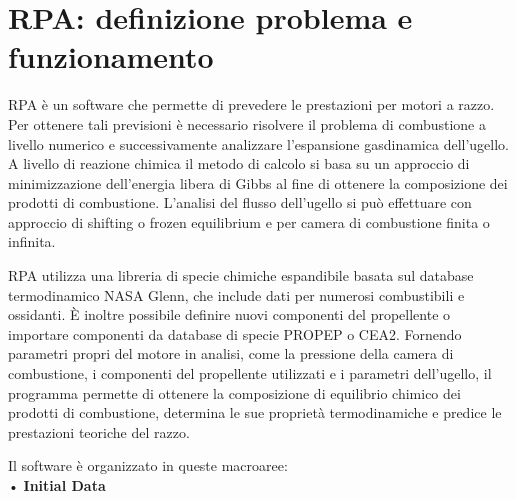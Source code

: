 \section{RPA: definizione problema e funzionamento}
\label{appendix:rpa}

RPA è un software che permette di prevedere le prestazioni per motori a razzo. Per ottenere tali previsioni è necessario risolvere il problema di combustione a livello numerico e successivamente analizzare l'espansione gasdinamica dell'ugello. \\
A livello di reazione chimica il metodo di calcolo si basa su un approccio di minimizzazione dell'energia libera di Gibbs al fine di ottenere la composizione dei prodotti di combustione.  L'analisi del flusso dell'ugello si può effettuare con approccio di shifting o frozen equilibrium e per camera di combustione finita o infinita.

RPA utilizza una libreria di specie chimiche espandibile basata sul database termodinamico NASA Glenn, che include dati per numerosi combustibili e ossidanti. È inoltre possibile definire nuovi componenti del propellente o importare componenti da database di specie PROPEP o CEA2.
Fornendo parametri propri del motore in analisi, come la pressione della camera di combustione, i componenti del propellente utilizzati e i parametri dell'ugello, il programma permette di ottenere la composizione di equilibrio chimico dei prodotti di combustione, determina le sue proprietà termodinamiche e predice le prestazioni teoriche del razzo. 

Il software è organizzato in queste macroaree: 
\\
• \textbf{Initial Data}

